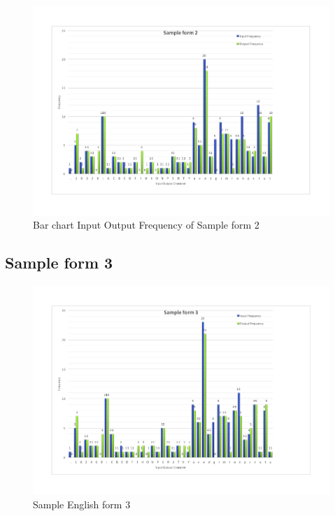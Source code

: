 \begin{figure}[H]
\centering
\includegraphics[width=1\textwidth]{form2.pdf}
\caption {Bar chart Input Output Frequency of Sample form 2}
\label {fig:bar2}
\end{figure}

\subsection{Sample form 3}

\begin{figure}[H]
\centering
\includegraphics[width=1\textwidth]{form3}
\caption {Sample English form 3}
\label {fig:form3}
\end{figure}

